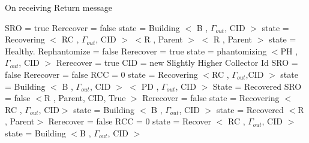 	
\begin{algorithm}[H]
\caption{On receiving Return message}
\label{ Done message received}
\scriptsize
\begin{multicols}{2}
\begin{algorithmic}[1]
  \State SRO = true
\EndIf
{}
		\State Rerecover = false
			\State state = Building			
			\State $<$ B , $\Gamma_{out}$, CID $>$
		\Else
			\State state = Recovering
			\State $<$ RC , $\Gamma_{out}$, CID $>$
		\EndIf
	\Else
		\State $<$R , Parent $>$
	\EndIf
\EndIf
{}
			\State $<$ R , Parent $>$
		\EndIf
		\State state = Healthy.
	\Else
		\State Rephantomize = false 
		\State Rerecover = true
		\State state = phantomizing
		\State $<$PH , $\Gamma_{out}$, CID $>$
	\EndIf
\EndIf
{}
				\State Rerecover = true
	  \State CID = new Slightly Higher Collector Id
				\State SRO = false
			\EndIf
				\State Rerecover = false
				\State RCC = 0
					\State state = Recovering
					\State $<$RC , $\Gamma_{out}$,CID $>$
				\Else
					\State state = Building
					\State $<$ B , $\Gamma_{out}$, CID $>$
				\EndIf
				\State $<$ PD , $\Gamma_{out}$, CID $>$
			\EndIf
		\Else
				\State State = Recovered
				\State SRO = false
				\State $<$R , Parent, CID, True $>$
				\State Rerecover = false
					\State state = Recovering
					\State $<$ RC , $\Gamma_{out}$, CID$>$
					\State state = Building
					\State $<$ B , $\Gamma_{out}$, CID $>$
				\EndIf
				\State state = Recovered
				\State $<$R , Parent$>$
			\EndIf
		\EndIf
			\State Rerecover = false
				\State RCC = 0
			\EndIf
				\State state = Recover
				\State $<$ RC , $\Gamma_{out}$, CID $>$
				\State state = Building
				\State $<$B , $\Gamma_{out}$, CID $>$
			\EndIf
		\EndIf
	\EndIf
\EndIf
\EndProcedure
\end{algorithmic}
\end{multicols}
\end{algorithm}	


